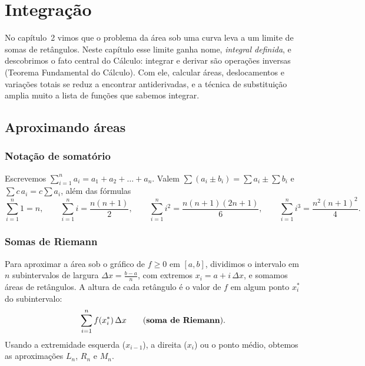 \chapter{Integração}

No capítulo~2 vimos que o problema da área sob uma curva leva a um limite de somas de
retângulos. Neste capítulo esse limite ganha nome, \emph{integral definida}, e descobrimos o
fato central do Cálculo: integrar e derivar são operações inversas (Teorema Fundamental do
Cálculo). Com ele, calcular áreas, deslocamentos e variações totais se reduz a encontrar
antiderivadas, e a técnica de substituição amplia muito a lista de funções que sabemos
integrar.

\section{Aproximando áreas}

\subsection{Notação de somatório}

Escrevemos $\displaystyle\sum_{i=1}^n a_i=a_1+a_2+\dots+a_n$. Valem
$\sum(a_i\pm b_i)=\sum a_i\pm\sum b_i$ e $\sum c\,a_i=c\sum a_i$, além das fórmulas
\[
\sum_{i=1}^n1=n,\qquad \sum_{i=1}^n i=\frac{n(n+1)}2,\qquad
\sum_{i=1}^n i^2=\frac{n(n+1)(2n+1)}6,\qquad \sum_{i=1}^n i^3=\frac{n^2(n+1)^2}4 .
\]

\subsection{Somas de Riemann}

Para aproximar a área sob o gráfico de $f\ge0$ em $[a,b]$, dividimos o intervalo em $n$
subintervalos de largura $\Delta x=\frac{b-a}n$, com extremos $x_i=a+i\,\Delta x$, e somamos
áreas de retângulos. A altura de cada retângulo é o valor de $f$ em algum ponto $x_i^*$ do
subintervalo:
\[
\sum_{i=1}^n f(x_i^*)\,\Delta x \qquad(\textbf{soma de Riemann}\index{soma de riemann@soma de Riemann}).
\]
Usando a extremidade esquerda ($x_{i-1}$), a direita ($x_i$) ou o ponto médio, obtemos as
aproximações $L_n$, $R_n$ e $M_n$.

